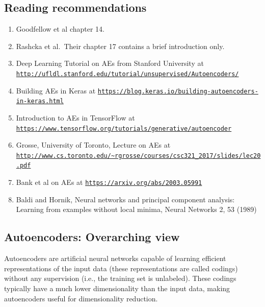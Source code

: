 \documentclass[%
oneside,                 %
final,                   %
10pt]{article}
\begin{document}
\subsection{Reading recommendations}

\begin{block}{}
\begin{enumerate}
\item Goodfellow et al chapter 14.

\item Rashcka et al.~Their chapter 17 contains a brief introduction only.

\item Deep Learning Tutorial on AEs from Stanford University at \href{{http://ufldl.stanford.edu/tutorial/unsupervised/Autoencoders/}}{\nolinkurl{http://ufldl.stanford.edu/tutorial/unsupervised/Autoencoders/}}

\item Building AEs in Keras at \href{{https://blog.keras.io/building-autoencoders-in-keras.html}}{\nolinkurl{https://blog.keras.io/building-autoencoders-in-keras.html}}

\item Introduction to AEs in TensorFlow at \href{{https://www.tensorflow.org/tutorials/generative/autoencoder}}{\nolinkurl{https://www.tensorflow.org/tutorials/generative/autoencoder}}

\item Grosse, University of Toronto, Lecture on AEs at \href{{http://www.cs.toronto.edu/~rgrosse/courses/csc321_2017/slides/lec20.pdf}}{\nolinkurl{http://www.cs.toronto.edu/~rgrosse/courses/csc321_2017/slides/lec20.pdf}}

\item Bank et al on AEs at \href{{https://arxiv.org/abs/2003.05991}}{\nolinkurl{https://arxiv.org/abs/2003.05991}}  

\item Baldi and Hornik, Neural networks and principal component analysis: Learning from examples without local minima, Neural Networks 2, 53 (1989)
\end{enumerate}

\noindent
\end{block}

\subsection{Autoencoders: Overarching view}

Autoencoders are artificial neural networks capable of learning
efficient representations of the input data (these representations are called codings)  without
any supervision (i.e., the training set is unlabeled). These codings
typically have a much lower dimensionality than the input data, making
autoencoders useful for dimensionality reduction. 
\end{document}
